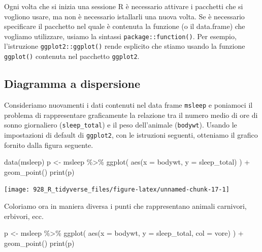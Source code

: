 \documentclass[
]{memoir}
\newenvironment{Shaded}{\begin{snugshade}}{\end{snugshade}}
\newcommand{\AttributeTok}[1]{\textcolor[rgb]{0.77,0.63,0.00}{#1}}
\newcommand{\FunctionTok}[1]{\textcolor[rgb]{0.00,0.00,0.00}{#1}}
\newcommand{\NormalTok}[1]{#1}
\newcommand{\OtherTok}[1]{\textcolor[rgb]{0.56,0.35,0.01}{#1}}
\newcommand{\SpecialCharTok}[1]{\textcolor[rgb]{0.00,0.00,0.00}{#1}}
\theoremstyle{definition}
\theoremstyle{definition}
\theoremstyle{definition}
\theoremstyle{definition}
\theoremstyle{remark}
\begin{document}
Ogni volta che si inizia una sessione R è necessario attivare i pacchetti che si vogliono usare, ma non è necessario istallarli una nuova volta. Se è necessario specificare il pacchetto nel quale è contenuta la funzione (o il data.frame) che vogliamo utilizzare, usiamo la sintassi \texttt{package::function()}. Per esempio, l'istruzione \texttt{ggplot2::ggplot()} rende esplicito che stiamo usando la funzione \texttt{ggplot()} contenuta nel pacchetto \texttt{ggplot2}.

\hypertarget{diagramma-a-dispersione}{%
\subsection{Diagramma a dispersione}\label{diagramma-a-dispersione}}

Consideriamo nuovamenti i dati contenuti nel data frame \texttt{msleep} e poniamoci il problema di rappresentare graficamente la relazione tra il numero medio di ore di sonno giornaliero (\texttt{sleep\_total}) e il peso dell'animale (\texttt{bodywt}). Usando le impostazioni di default di \texttt{ggplot2}, con le istruzioni seguenti, otteniamo il grafico fornito dalla figura seguente.

\begin{Shaded}
\begin{Highlighting}[]
\FunctionTok{data}\NormalTok{(msleep)}
\NormalTok{p }\OtherTok{\textless{}{-}}\NormalTok{ msleep }\SpecialCharTok{\%\textgreater{}\%}
  \FunctionTok{ggplot}\NormalTok{(}
    \FunctionTok{aes}\NormalTok{(}\AttributeTok{x =}\NormalTok{ bodywt, }\AttributeTok{y =}\NormalTok{ sleep\_total)}
\NormalTok{  ) }\SpecialCharTok{+}
  \FunctionTok{geom\_point}\NormalTok{()}
\FunctionTok{print}\NormalTok{(p)}
\end{Highlighting}
\end{Shaded}

\begin{center}\texttt{[image: 928\_R\_tidyverse\_files/figure-latex/unnamed-chunk-17-1]} \end{center}

Coloriamo ora in maniera diversa i punti che rappresentano animali carnivori, erbivori, ecc.

\begin{Shaded}
\begin{Highlighting}[]
\NormalTok{p }\OtherTok{\textless{}{-}}\NormalTok{ msleep }\SpecialCharTok{\%\textgreater{}\%}
  \FunctionTok{ggplot}\NormalTok{(}
    \FunctionTok{aes}\NormalTok{(}\AttributeTok{x =}\NormalTok{ bodywt, }\AttributeTok{y =}\NormalTok{ sleep\_total, }\AttributeTok{col =}\NormalTok{ vore)}
\NormalTok{  ) }\SpecialCharTok{+}
  \FunctionTok{geom\_point}\NormalTok{()}
\FunctionTok{print}\NormalTok{(p)}
\end{Highlighting}
\end{Shaded}
\end{document}
